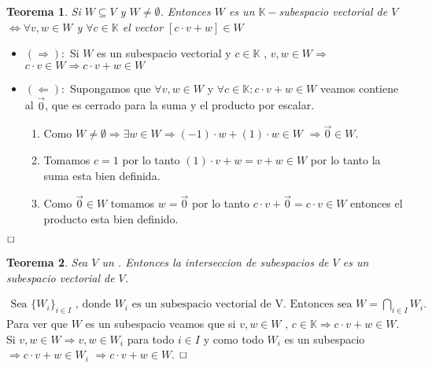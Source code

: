 \documentclass[]{article}
\newtheorem{theorem}{Teorema}
\newenvironment{proof}{\noindent{\bf Prueba:}}{$\hfill \Box$ \vspace{10pt}}
\newcommand{\kk}{
    \mathbb{K}
}
\newcommand{\ida}{\Longrightarrow}
\begin{document}
\newpage

\begin{theorem}
    Si $W \subseteq V$ y $W\neq \emptyset$. Entonces $W$ es un $\mathbb{K}-$subespacio vectorial de $V$ $\iff \forall v,w \in W$
    y $\forall c \in \mathbb{K}$ el vector $[c \cdot v + w] \in W$ 
\end{theorem}
\begin{proof}
    \begin{itemize}
        \item $(\Longrightarrow):$ Si $W$ es un subespacio vectorial y $c \in \mathbb{K}$ , $v,w \in W \Longrightarrow$
        $c \cdot v \in W \Longrightarrow c \cdot v + w \in W$
        \item $(\Longleftarrow):$ Supongamos que $\forall v,w \in W$ y  $\forall c \in \mathbb{K} : c \cdot v + w \in W$ veamos contiene
        al $\vec{0}$, que es cerrado para la suma y el producto por escalar.
        \begin{enumerate}
            
            \item Como $W \neq \emptyset \Longrightarrow \exists w \in W \Longrightarrow (-1) \cdot w + (1) \cdot w \in W$
            $\Longrightarrow \vec{0} \in W$.
            \item Tomamos $c=1$ por lo tanto $(1) \cdot v + w = v + w \in W$ por lo tanto la suma esta bien definida.
            \item Como $\vec{0} \in W$ tomamos $w=\vec{0}$ por lo tanto $c \cdot v + \vec{0} = c \cdot v \in W$
            entonces el producto esta bien definido.
        \end{enumerate}
    \end{itemize}
\end{proof}

\begin{theorem}
    Sea $V$ un \espvec. Entonces la interseccion de subespacios de $V$ es un subespacio vectorial de $V$.
\end{theorem}
\begin{proof}
    \begin{align*}
        \text{Sea $\{ W_i \}_{i \in I}$ , donde $W_i$ es un subespacio vectorial de V. Entonces sea } W = \bigcap_{i \in I}W_i.
    \end{align*}
    Para ver que $W$ es un subespacio veamos que si $v,w \in W$ , $c \in \kk \ida c \cdot v + w \in W$.\\
    Si $v,w \in W \ida v,w \in W_i$ para todo $i \in I$ y como todo $W_i$ es un subespacio $\ida c \cdot v + w \in W_i$
    $\ida c \cdot v + w \in W$.
\end{proof}
\end{document}
